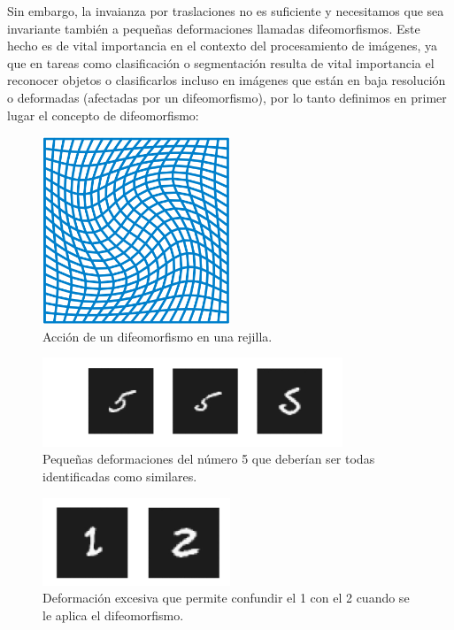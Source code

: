 \medskip
    
\noindent Sin embargo, la invaianza por traslaciones no es suficiente y necesitamos que sea invariante también a pequeñas deformaciones llamadas difeomorfismos. Este hecho es de vital importancia en el contexto del procesamiento de imágenes, ya que en tareas como clasificación o segmentación resulta de vital importancia el reconocer objetos o clasificarlos incluso en imágenes que están en baja resolución o deformadas (afectadas por un difeomorfismo), por lo tanto definimos en primer lugar el concepto de difeomorfismo: 

\begin{figure}[!h]
    \centering
    \includegraphics[width=0.5\textwidth]{img/Diffeomorphism.png}
    \caption{Acción de un difeomorfismo en una rejilla.}
    \label{fig:difeomorfismo}
\end{figure}

\begin{figure}[!h]
    \centering
    \includegraphics[width=0.8\textwidth]{img/5_deformado.png}
    \caption{Pequeñas deformaciones del número 5 que deberían ser todas identificadas como similares.}
    \label{fig:deformaciones_5}
\end{figure}

\begin{figure}[!h]
    \centering
    \includegraphics[width=0.5\textwidth]{img/1_excesivamente_deformado.png}
    \caption{Deformación excesiva que permite confundir el 1 con el 2 cuando se le aplica el difeomorfismo.}
    \label{fig:deformaciones_1}
\end{figure}

